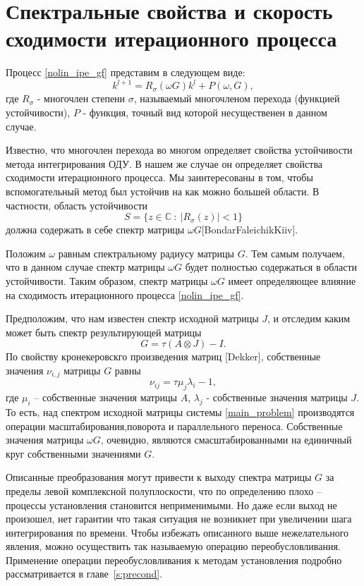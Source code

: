 \documentclass[a4paper,12pt]{report}
\begin{document}
  \section{Спектральные свойства и скорость сходимости итерационного процесса}
  \label{s:spectral_speed} 
Процесс \eqref{nolin_ipe_gf} представим в следующем виде:
	\begin{equation}
	\label{ipe_spektr_form}
	k^{l+1} = R_\sigma(\omega G)k^l+P(\omega, G),
	\end{equation}
где $R_\sigma$ - многочлен степени $\sigma$, называемый многочленом перехода (функцией устойчивости),  $P$ - функция, точный вид которой несущественен в данном случае.
	
	Известно, что многочлен перехода во многом определяет свойства устойчивости метода интегрирования ОДУ. В нашем же случае он определяет свойства сходимости итерационного процесса. Мы заинтересованы в том, чтобы вспомогательный метод был устойчив на как можно большей области. В частности, область устойчивости
$$ S = \{z \in \mathbb{C}\ :\  |R_{\sigma}(z)|<1  \}$$
должна содержать в себе  спектр матрицы $\omega G$[BondarFaleichikKiiv].

Положим $\omega$ равным спектральному радиусу матрицы $G$. Тем самым получаем, что в данном случае спектр матрицы $\omega G$ будет полностью содержаться в области устойчивости. Таким образом, спектр матрицы $\omega G$ имеет определяющее влияние на сходимость итерационного процесса \eqref{nolin_ipe_gf}.

Предположим, что нам известен спектр исходной матрицы $J$, и отследим каким может быть спектр результирующей матрицы
	$$G = \tau(A\otimes J) - I.$$
По свойству кронекеровскго произведения матриц [Dekker], собственные значения $\nu_{i,j}$ матрицы $G$ равны
	\begin{equation}\label{spektrG}
	\nu_{ij} = \tau \mu_j \lambda_i - 1,
	\end{equation}
где $\mu_i$ -- собственные значения матрицы $A$, $\lambda_j$ - собственные значения матрицы $J$. То есть, над  спектром исходной матрицы системы \eqref{main_problem} производятся операции масштабирования,поворота и параллельного переноса. Собственные значения матрицы $\omega G$, очевидно, являются смасштабированными на единичный круг собственными значениями  $G$. 

Описанные преобразования могут привести к выходу спектра матрицы $G$ за пределы левой комплексной полуплоскости, что по определению плохо – процессы установления становится неприменимыми. Но даже если выход не произошел, нет гарантии что такая ситуация не возникнет при увеличении шага интегрирования по
времени. Чтобы избежать описанного выше нежелательного явления, можно осуществить так называемую операцию переобусловливания. Применение операции переобусловливания к методам установления подробно рассматривается  в главе~\ref{s:precond}.
\end{document}
